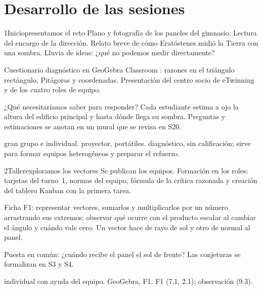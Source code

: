 \section{Desarrollo de las sesiones}

\begin{sesionbox}{1}{Inicio}{presentamos el reto}
 Plano y fotografía de los paneles del gimnasio. Lectura del encargo de la dirección. Relato breve de cómo Eratóstenes midió la Tierra con una sombra. Lluvia de ideas: ¿qué no podemos medir directamente?

 Cuestionario diagnóstico en GeoGebra Classroom \parencite{geogebra}: razones en el triángulo rectángulo, Pitágoras y coordenadas. Presentación del centro socio de eTwinning y de los cuatro roles de equipo.

 ¿Qué necesitaríamos saber para responder? Cada estudiante estima a ojo la altura del edificio principal y hasta dónde llega su sombra. Preguntas y estimaciones se anotan en un mural que se revisa en S20.

 gran grupo e individual.  proyector, portátiles.  diagnóstico, sin calificación; sirve para formar equipos heterogéneos y preparar el refuerzo.
\end{sesionbox}

\begin{sesionbox}{2}{Taller}{exploramos los vectores}
 Se publican los equipos. Formación en los roles: tarjetas del turno~1, normas del equipo, fórmula de la crítica razonada y creación del tablero Kanban con la primera tarea.

 Ficha F1: representar vectores, sumarlos y multiplicarlos por un número arrastrando sus extremos; observar qué ocurre con el producto escalar al cambiar el ángulo y cuándo vale cero. Un vector hace de rayo de sol y otro de normal al panel.

 Puesta en común: ¿cuándo recibe el panel el sol de frente? Las conjeturas se formalizan en S3 y S4.

 individual con ayuda del equipo.  GeoGebra, F1.  F1 (7.1, 2.1); observación (9.3).
\end{sesionbox}

